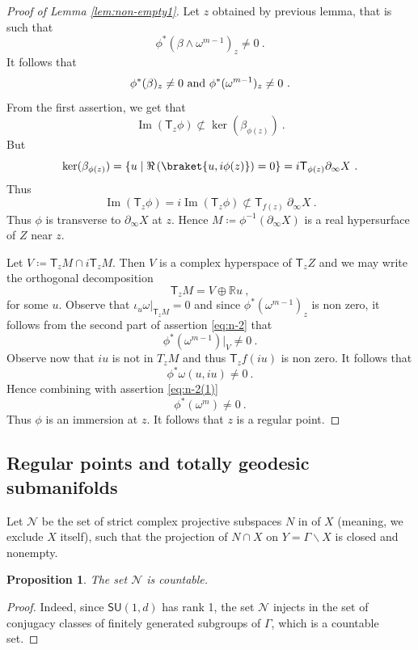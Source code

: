 \documentclass[12pt,reqno]{amsart}
\newtheorem{proposition}[theorem]{Proposition}
\newcommand{\T}{\ms T}
\newcommand{\ms}{\mathsf}
\newcommand{\mc}{\mathcal}
\newcommand{\defeq}{\coloneqq}
\newcommand{\im}{\operatorname{Im}}
\begin{document}
\begin{proof}[Proof of Lemma  \ref{lem:non-empty1}] Let $z$ obtained by previous lemma, that is such that 
$$
\phi^*(\beta\wedge\omega^{m-1})_z\not=0\ .
$$
It follows that 
\begin{equation}
\phi^*(\beta)_z\not=0\hbox{ and } 	\phi^*(\omega^{m-1})_z\not=0 \label{eq:n-2}\ .
\end{equation}
From the first assertion, we get that 
$$\im(\T_z\phi)\not\subset \ker(\beta_{\phi(z)})\ .$$
But
$$
\ker(\beta_{\phi(z)})=\{u\mid \Re\left( \braket{u,i \phi(z)}\right)=0\}=i\T_{\phi(z)}\partial_\infty X\ .$$
Thus 
$$\im(\T_z \phi)=i \im(\T_z \phi)\not\subset \T_{f(z)} \ \partial_\infty X \ .$$
Thus $\phi$ is transverse to $\partial_\infty X$ at $z$. Hence  $M\defeq \phi^{-1}(\partial_\infty X)$ is a real hypersurface  of $Z$ near $z$. 

Let $V\defeq \T_z M\cap i \T_z M$. Then $V$ is a complex hyperspace of $\T_z Z$ and we may write the orthogonal decomposition
$$
\T_z M=V\oplus \mathbb R u\ ,
$$
for some $u$. Observe that $\iota_u\omega\big\vert_{\T_zM}=0$ and  since $\phi^*(\omega^{{m-1}})_z$ is non zero, it follows from the second part of assertion \eqref{eq:n-2} that \begin{equation}
	\phi^*(\omega^{m-1})\big\vert_V\not=0\ .\label{eq:n-2(1)}
\end{equation}
Observe now that  $iu$ is not in $T_z M$ and thus $\T_zf (iu)$ is non zero. It follows that 
$$
\phi^*\omega(u,iu)\not=0\ .
$$
Hence combining with assertion \eqref{eq:n-2(1)}
$$
\phi^*(\omega^{m})\not=0\ .
$$
Thus $\phi$ is an immersion at $z$. It follows that $z$ is a regular point.
\end{proof}
\subsection{Regular points and totally geodesic submanifolds}

Let $\mc N$ be the set of strict complex projective subspaces $N$ in of $X$ (meaning, we exclude $X$ itself), such that the projection of $N\cap X$ on $Y=\Gamma\backslash X$ is closed and nonempty.


\begin{proposition}
	The set $\mc N$ is countable.
\end{proposition}
\begin{proof} Indeed, since $\mathsf{SU}(1,d)$ has rank 1, the set $\mc N$ injects in the set of conjugacy classes of finitely generated  subgroups of $\Gamma$, which is a countable set.
\end{proof}
\end{document}
